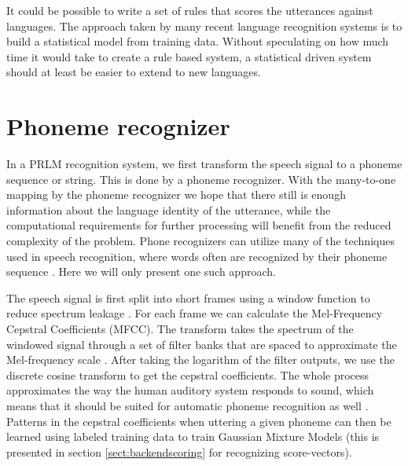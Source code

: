 It could be possible to write a set of rules that scores the utterances against languages. The approach taken by many recent language recognition systems is to build a statistical model from training data. Without speculating on how much time it would take to create a rule based system, a statistical driven system should at least be easier to extend to new languages.


\section{Phoneme recognizer}
\label{sect:phnrec}

In a PRLM recognition system, we first transform the speech signal to a phoneme sequence or string. This is done by a phoneme recognizer. With the many-to-one mapping by the phoneme recognizer we hope that there still is enough information about the language identity of the utterance, while the computational requirements for further processing will benefit from the reduced complexity of the problem. Phone recognizers can utilize many of the techniques used in speech recognition,  where words often are recognized by their phoneme sequence \cite[p. 414]{talegk}. Here we will only present one such approach.

The speech signal is first split into short frames using a window function to reduce spectrum leakage \cite[257]{talegk}. For each frame we can calculate the Mel-Frequency Cepstral Coefficients (MFCC). The transform takes the spectrum of the windowed signal through a set of filter banks that are spaced to approximate the Mel-frequency scale \cite[314]{talegk}. After taking the logarithm of the filter outputs, we use the discrete cosine transform to get the cepstral coefficients. The whole process approximates the way the human auditory system responds to sound, which means that it should be suited for automatic phoneme recognition as well \cite[314]{talegk}. Patterns in the cepstral coefficients when uttering a given phoneme can then be learned using labeled training data to train Gaussian Mixture Models (this is presented in section \ref{sect:backendscoring} for recognizing score-vectors).

